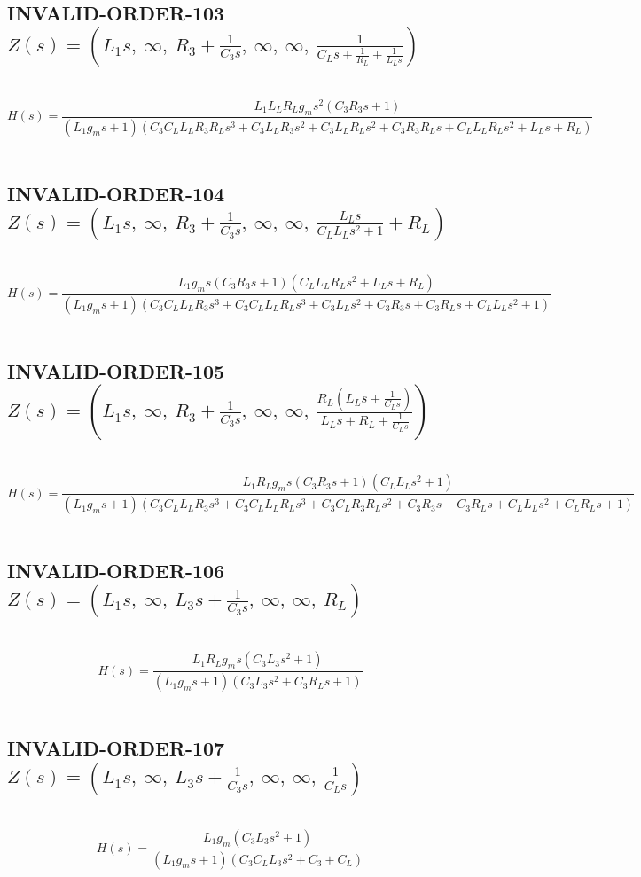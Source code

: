 \documentclass{article}
\begin{document}
\subsection{INVALID-ORDER-103 $Z(s) = \left( L_{1} s, \  \infty, \  R_{3} + \frac{1}{C_{3} s}, \  \infty, \  \infty, \  \frac{1}{C_{L} s + \frac{1}{R_{L}} + \frac{1}{L_{L} s}}\right)$ } \ 
\textbf{\[H(s) = \frac{L_{1} L_{L} R_{L} g_{m} s^{2} \left(C_{3} R_{3} s + 1\right)}{\left(L_{1} g_{m} s + 1\right) \left(C_{3} C_{L} L_{L} R_{3} R_{L} s^{3} + C_{3} L_{L} R_{3} s^{2} + C_{3} L_{L} R_{L} s^{2} + C_{3} R_{3} R_{L} s + C_{L} L_{L} R_{L} s^{2} + L_{L} s + R_{L}\right)}\] } \ 
\subsection{INVALID-ORDER-104 $Z(s) = \left( L_{1} s, \  \infty, \  R_{3} + \frac{1}{C_{3} s}, \  \infty, \  \infty, \  \frac{L_{L} s}{C_{L} L_{L} s^{2} + 1} + R_{L}\right)$ } \ 
\textbf{\[H(s) = \frac{L_{1} g_{m} s \left(C_{3} R_{3} s + 1\right) \left(C_{L} L_{L} R_{L} s^{2} + L_{L} s + R_{L}\right)}{\left(L_{1} g_{m} s + 1\right) \left(C_{3} C_{L} L_{L} R_{3} s^{3} + C_{3} C_{L} L_{L} R_{L} s^{3} + C_{3} L_{L} s^{2} + C_{3} R_{3} s + C_{3} R_{L} s + C_{L} L_{L} s^{2} + 1\right)}\] } \ 
\subsection{INVALID-ORDER-105 $Z(s) = \left( L_{1} s, \  \infty, \  R_{3} + \frac{1}{C_{3} s}, \  \infty, \  \infty, \  \frac{R_{L} \left(L_{L} s + \frac{1}{C_{L} s}\right)}{L_{L} s + R_{L} + \frac{1}{C_{L} s}}\right)$ } \ 
\textbf{\[H(s) = \frac{L_{1} R_{L} g_{m} s \left(C_{3} R_{3} s + 1\right) \left(C_{L} L_{L} s^{2} + 1\right)}{\left(L_{1} g_{m} s + 1\right) \left(C_{3} C_{L} L_{L} R_{3} s^{3} + C_{3} C_{L} L_{L} R_{L} s^{3} + C_{3} C_{L} R_{3} R_{L} s^{2} + C_{3} R_{3} s + C_{3} R_{L} s + C_{L} L_{L} s^{2} + C_{L} R_{L} s + 1\right)}\] } \ 
\subsection{INVALID-ORDER-106 $Z(s) = \left( L_{1} s, \  \infty, \  L_{3} s + \frac{1}{C_{3} s}, \  \infty, \  \infty, \  R_{L}\right)$ } \ 
\textbf{\[H(s) = \frac{L_{1} R_{L} g_{m} s \left(C_{3} L_{3} s^{2} + 1\right)}{\left(L_{1} g_{m} s + 1\right) \left(C_{3} L_{3} s^{2} + C_{3} R_{L} s + 1\right)}\] } \ 
\subsection{INVALID-ORDER-107 $Z(s) = \left( L_{1} s, \  \infty, \  L_{3} s + \frac{1}{C_{3} s}, \  \infty, \  \infty, \  \frac{1}{C_{L} s}\right)$ } \ 
\textbf{\[H(s) = \frac{L_{1} g_{m} \left(C_{3} L_{3} s^{2} + 1\right)}{\left(L_{1} g_{m} s + 1\right) \left(C_{3} C_{L} L_{3} s^{2} + C_{3} + C_{L}\right)}\] } \ 
\end{document}
